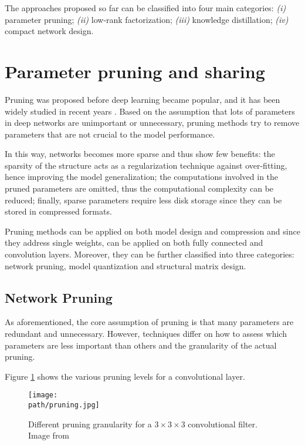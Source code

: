 \newline 
The approaches proposed so far can be classified into four main categories: \emph{(i)} parameter pruning; \emph{(ii)} low-rank factorization; \emph{(iii)} knowledge distillation; \emph{(iv)} compact network design.


\section{Parameter pruning and sharing}
Pruning was proposed before deep learning became popular, and it has been widely studied in recent years \parencite{brain-damage}. Based on the assumption that lots of parameters in deep networks are unimportant or unnecessary, pruning methods try to remove parameters that are not crucial to the model performance. 
\newline 

In this way, networks becomes more sparse and thus show few benefits: the sparsity of the structure acts as a regularization technique against over-fitting, hence improving the model generalization; the computations involved in the pruned parameters are omitted, thus the computational complexity can be reduced; finally, sparse parameters require less disk storage since they can be stored in compressed formats. 
\newline 

Pruning methods can be applied on both model design and compression and since they address single weights, can be applied on both fully connected and convolution layers. Moreover, they can be further classified into three categories: network pruning, model quantization and structural matrix design.  

\subsection{Network Pruning}
\label{subsec:pruning}
As aforementioned, the core assumption of pruning is that many parameters are redundant and unnecessary. However, techniques differ on how to assess which parameters are less important than others and the granularity of the actual pruning. 

Figure \ref{fig:pruning} shows the various pruning levels for a convolutional layer.

\begin{figure}[h!]
 \centering
 \texttt{[image: \\path/pruning.jpg]} 
 \caption{Different pruning granularity for a $3 \times 3 \times 3$ convolutional filter. Image from \parencite{survey2018}}
 \label{fig:pruning}
\end{figure}

